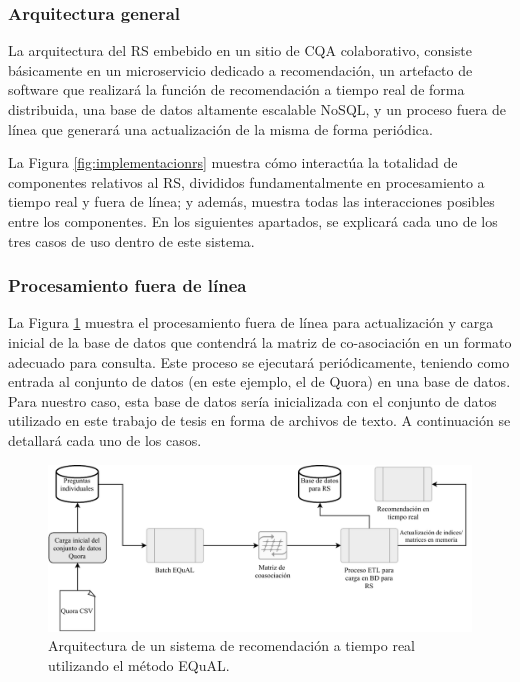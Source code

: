 \subsubsection{Arquitectura general}
La arquitectura del RS embebido en un sitio de CQA colaborativo, consiste básicamente en un microservicio dedicado a recomendación, un artefacto de software que realizará la función de recomendación a tiempo real de forma distribuida, una base de datos altamente escalable NoSQL, y un proceso fuera de línea que generará una actualización de la misma de forma periódica.

\bigskip La Figura \ref{fig:implementacionrs} muestra cómo interactúa la totalidad de componentes relativos al RS, divididos fundamentalmente en procesamiento a tiempo real y fuera de línea; y además, muestra todas las interacciones posibles entre los componentes. En los siguientes apartados, se explicará cada uno de los tres casos de uso dentro de este sistema.

\subsubsection{Procesamiento fuera de línea}
La Figura \ref{fig:implementacionrsbatch} muestra el procesamiento fuera de línea para actualización y carga inicial de la base de datos que contendrá la matriz de co-asociación en un formato adecuado para consulta. Este proceso se ejecutará periódicamente, teniendo como entrada al conjunto de datos (en este ejemplo, el de Quora) en una base de datos. Para nuestro caso, esta base de datos sería inicializada con el conjunto de datos utilizado en este trabajo de tesis en forma de archivos de texto. A continuación se detallará cada uno de los casos.

\bigskip
\begin{figure}[h!]
	\centering
	\includegraphics[width=0.9\linewidth]{8_problema_investigacion/imagenes/implementacion_rs_batch}
	\caption{Arquitectura de un sistema de recomendación a tiempo real utilizando el método EQuAL.}
	\label{fig:implementacionrsbatch}
\end{figure}


